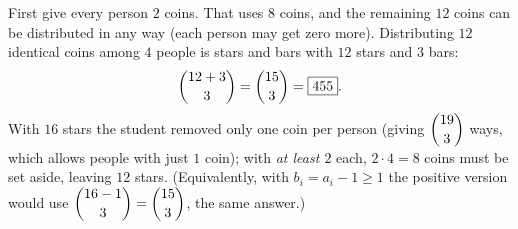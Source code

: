 First give every person $2$ coins. That uses $8$ coins, and the remaining $12$ coins can be distributed in any way (each person may get zero more). Distributing $12$ identical coins among $4$ people is stars and bars with $12$ stars and $3$ bars:
\[
\dbinom{12+3}{3}=\dbinom{15}{3}=\boxed{455}.
\]
With $16$ stars the student removed only one coin per person (giving $\dbinom{19}{3}$ ways, which allows people with just $1$ coin); with \emph{at least $2$} each, $2\cdot4=8$ coins must be set aside, leaving $12$ stars. (Equivalently, with $b_i=a_i-1\ge1$ the positive version would use $\dbinom{16-1}{3}=\dbinom{15}{3}$, the same answer.)
